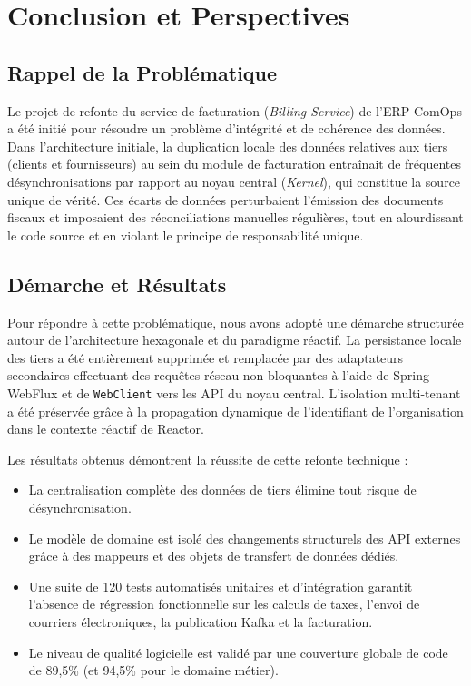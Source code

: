 \chapter{Conclusion et Perspectives}

\section{Rappel de la Problématique}
Le projet de refonte du service de facturation (\textit{Billing Service}) de l'ERP ComOps a été initié pour résoudre un problème d'intégrité et de cohérence des données. Dans l'architecture initiale, la duplication locale des données relatives aux tiers (clients et fournisseurs) au sein du module de facturation entraînait de fréquentes désynchronisations par rapport au noyau central (\textit{Kernel}), qui constitue la source unique de vérité. Ces écarts de données perturbaient l'émission des documents fiscaux et imposaient des réconciliations manuelles régulières, tout en alourdissant le code source et en violant le principe de responsabilité unique.

\section{Démarche et Résultats}
Pour répondre à cette problématique, nous avons adopté une démarche structurée autour de l'architecture hexagonale et du paradigme réactif. La persistance locale des tiers a été entièrement supprimée et remplacée par des adaptateurs secondaires effectuant des requêtes réseau non bloquantes à l'aide de Spring WebFlux et de \texttt{WebClient} vers les API du noyau central. L'isolation multi-tenant a été préservée grâce à la propagation dynamique de l'identifiant de l'organisation dans le contexte réactif de Reactor.

Les résultats obtenus démontrent la réussite de cette refonte technique :
\begin{itemize}
    \item La centralisation complète des données de tiers élimine tout risque de désynchronisation.
    \item Le modèle de domaine est isolé des changements structurels des API externes grâce à des mappeurs et des objets de transfert de données dédiés.
    \item Une suite de 120 tests automatisés unitaires et d'intégration garantit l'absence de régression fonctionnelle sur les calculs de taxes, l'envoi de courriers électroniques, la publication Kafka et la facturation.
    \item Le niveau de qualité logicielle est validé par une couverture globale de code de 89,5\% (et 94,5\% pour le domaine métier).
\end{itemize}

